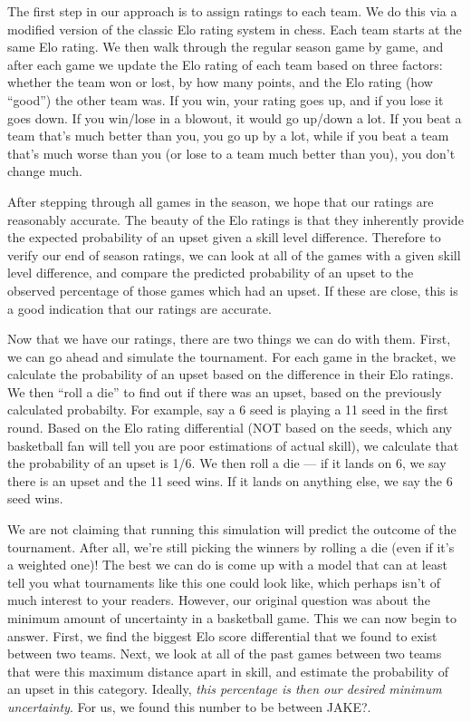 \documentclass{article}
\begin{document}
The first step in our approach is to assign ratings to each team. We do this via a modified version of the classic Elo rating system in chess. Each team starts at the same Elo rating. We then walk through the regular season game by game, and after each game we update the Elo rating of each team based on three factors: whether the team won or lost, by how many points, and the Elo rating (how ``good'') the other team was. If you win, your rating goes up, and if you lose it goes down. If you win/lose in a blowout, it would go up/down a lot. If you beat a team that's much better than you, you go up by a lot, while if you beat a team that's much worse than you (or lose to a team much better than you), you don't change much. 

After stepping through all games in the season, we hope that our ratings are reasonably accurate. The beauty of the Elo ratings is that they inherently provide the expected probability of an upset given a skill level difference. Therefore to verify our end of season ratings, we can look at all of the games with a given skill level difference, and compare the predicted probability of an upset to the observed percentage of those games which had an upset. If these are close, this is a good indication that our ratings are accurate.

Now that we have our ratings, there are two things we can do with them. First, we can go ahead and simulate the tournament. For each game in the bracket, we calculate the probability of an upset based on the difference in their Elo ratings. We then ``roll a die'' to find out if there was an upset, based on the previously calculated probabilty. For example, say a 6 seed is playing a 11 seed in the first round. Based on the Elo rating differential (NOT based on the seeds, which any basketball fan will tell you are poor estimations of actual skill), we calculate that the probability of an upset is 1/6. We then roll a die --- if it lands on 6, we say there is an upset and the 11 seed wins. If it lands on anything else, we say the 6 seed wins.

We are not claiming that running this simulation will predict the outcome of the tournament. After all, we're still picking the winners by rolling a die (even if it's a weighted one)! The best we can do is come up with a model that can at least tell you what tournaments like this one could look like, which perhaps isn't of much interest to your readers. However, our original question was about the minimum amount of uncertainty in a basketball game. This we can now begin to answer. First, we find the biggest Elo score differential that we found to exist between two teams. Next, we look at all of the past games between two teams that were this maximum distance apart in skill, and estimate the probability of an upset in this category. Ideally, \textit{this percentage is then our desired minimum uncertainty}. For us, we found this number to be between JAKE?\@. 
\end{document}
